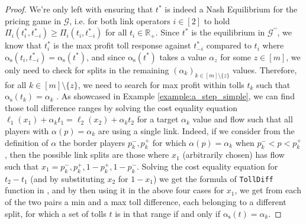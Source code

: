\documentclass[10pt,a4paper]{book}
\newcommand{\as}{\mathrm{\alpha_s}}
\newcommand{\R}{\mathbb{R}}
\newcommand{\Gm}{\mathcal{G}}
\theoremstyle{definition}
\theoremstyle{comment}
\begin{document}
\begin{proof}
	We're only left with ensuring that $t^*$ is indeed a Nash Equilibrium for the pricing game in $\Gm$, i.e. for both link operators $i \in [2]$ to hold $\Pi_i(t_i^*, t_{-i}^*) \ge \Pi_i(t_i, t_{-i}^*)$ for all $t_i \in \R_+$.
	Since $t^*$ is the equilibrium in $\Gm^{\prime\prime}$, we know that $t_i^*$ is the max profit toll response against $t_{-i}^*$ compared to $t_i$ where $\as(t_i, t_{-i}^*) = \as(t^*)$, and since $\as(t^*)$ takes a value $\alpha_z$ for some $z \in [m]$, we only need to check for splits in the remaining $(\alpha_k)_{k \in [m] \setminus \{z\}}$ values.
	Therefore, for all $k \in [m] \setminus \{z\}$, we need to search for max profit within tolls $t_k$ such that $\as(t_k) = \alpha_k$ .
	As showcased in Example \ref{example:a_step_simple}, we can find those toll difference ranges by solving the cost equality equation $\ell_1(x_1) + \alpha_k t_1 = \ell_2(x_2) + \alpha_k t_2$ for a target $\alpha_k$ value and flow such that all players with $\alpha(p) = \alpha_k$ are using a single link.
	Indeed, if we consider from the definition of $\alpha$ the border players $p_k^-, p_k^+$ for which $\alpha(p) = \alpha_k$ when $p_k^- < p < p_k^+$, then the possible link splits are those where $x_1$ (arbitrarily chosen) has flow such that $x_1 = p_k^-, p_k^+, 1 - p_k^+, 1 - p_k^-$.
	Solving the cost equality equation for $t_2 - t_1$ (and by substituting $x_2$ for $1 - x_1$) we get the formula of \texttt{TollDiff} function in , and by then using it in the above four cases for $x_1$, we get from each of the two pairs a min and a max toll difference, each belonging to a different split, for which a set of tolls $t$ is in that range if and only if $\as(t) = \alpha_k$.


\end{proof}
\end{document}
